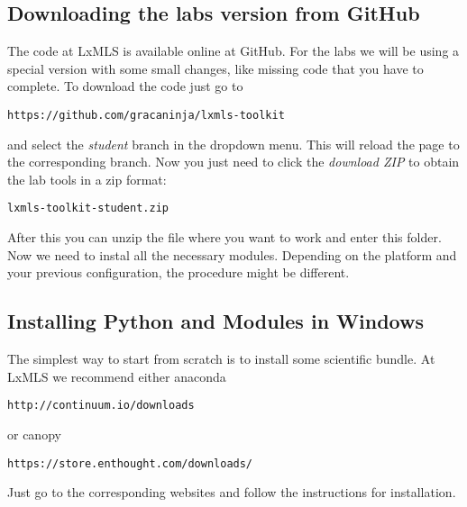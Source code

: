 \subsection{Downloading the labs version from GitHub}

The code at LxMLS is available online at GitHub. For the labs we will be using a special version with some small changes, like missing code that you have to complete. To download the code just go to

\begin{verbatim}
https://github.com/gracaninja/lxmls-toolkit
\end{verbatim}

\noindent and select the \textit{student} branch in the dropdown menu. This will reload the page to the corresponding branch. Now you just need to click the \textit{download ZIP} to obtain the lab tools in a zip format:

\begin{verbatim}
lxmls-toolkit-student.zip
\end{verbatim}

After this you can unzip the file where you want to work and enter this folder. Now we need to instal all the necessary modules. Depending on the platform and your previous configuration, the procedure might be different. 

\subsection{Installing Python and Modules in Windows}

The simplest way to start from scratch is to install some scientific bundle. At LxMLS we recommend either anaconda 

\begin{verbatim}
http://continuum.io/downloads
\end{verbatim}

\noindent or canopy

\begin{verbatim}
https://store.enthought.com/downloads/
\end{verbatim}

Just go to the corresponding websites and follow the instructions for installation.

